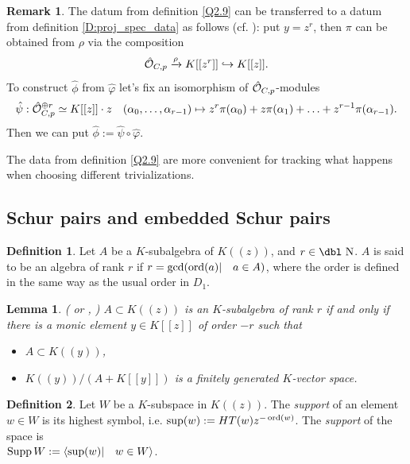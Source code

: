 \documentclass[11pt]{article}
\theoremstyle{definition}
\newcommand{\dn}{{\mbox{\dbl N}}}
\newcommand{\ord}{\mathop{\rm ord}\nolimits}
\newcommand{\Sup}{\mathop {\rm Supp}}
\newtheorem{Def}{Definition}[section]
\newtheorem{rem}{Remark}[section]
\theoremstyle{plain}
\newtheorem{lemma}{Lemma}[section]
\numberwithin{equation}{section}
\newcommand{\co}{{{\cal O}}}
\begin{document}
\begin{rem}
\label{R:Q.2.9}
The datum from definition \ref{Q2.9} can be transferred to a datum from definition \ref{D:proj_spec_data} as follows (cf. \cite[Rem. 2.13]{Q}): put $y=z^r$, then $\pi$ can be obtained from $\rho$ via the composition
$$
\hat{\co}_{C,p}\xrightarrow{\rho}K[[z^r]]\hookrightarrow K[[z]].
$$ 
To construct $\hat{\phi}$ from $\hat{\varphi}$ let's fix an isomorphism of  $\hat{\co}_{C,p}$-modules 
$$
\hat{\psi} : \hat{\co}_{C,p}^{\oplus r} \simeq K[[z]]\cdot z\quad (\alpha_0, \ldots ,\alpha_{r-1})\mapsto z^r\pi (\alpha_0)+z\pi (\alpha_1)+\ldots +z^{r-1}\pi (\alpha_{r-1}).
$$ 
Then we can put $\hat{\phi}:=\hat{\psi}\circ \hat{\varphi}$. 

The data from definition \ref{Q2.9} are more convenient for tracking what happens when choosing different trivializations.
\end{rem}

\subsection{Schur pairs and embedded Schur pairs}
\label{S:embedded}

\begin{Def}
\label{D:Q5.1} 
Let $A$ be a $K$-subalgebra of $K((z))$, and $r\in \dn$. $A$ is said to be an algebra of rank $r$ if 
$r= \gcd (\ord(a)|\quad  a\in A)$, where the order is defined in the same way as the usual order  in $D_1$.
\end{Def}


\begin{lemma}{(\cite{Mu} or \cite[L.5.2. and Rem]{Q}, \cite[Rem 9.13]{Zheglov_book})}
\label{Q5.2}
$A\subset K((z))$ is an $K$-subalgebra of rank $r$ if and only if there is a monic element $y\in K[[z]]$ of order $-r$ such that 
\begin{itemize}
\item
$A\subset K((y))$,
\item 
$K((y))/(A+K[[y]])$ is a finitely generated $K$-vector space.
\end{itemize}
\end{lemma}

\begin{Def}
\label{D:support} 
Let $W$ be a $K$-subspace in $K((z))$. The {\it support} of an element $w\in W$ is its highest symbol, i.e. $\sup (w):=HT(w)z^{-\ord (w)}$. The {\it support} of the space is\\
 $\Sup W:=\langle \sup (w)|\quad w\in W\rangle$. 
\end{Def}
\end{document}
